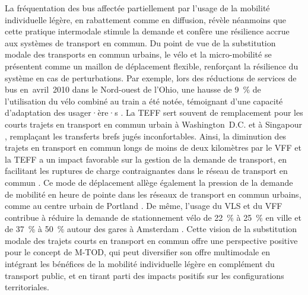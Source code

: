 \begin{refsegment}
La fréquentation des bus affectée partiellement par l'usage de la mobilité individuelle légère, en rabattement comme en diffusion, révèle néanmoins que cette pratique intermodale stimule la demande et confère une résilience accrue aux systèmes de transport en commun. Du point de vue de la substitution modale des transports en commun urbains, le vélo et la micro-mobilité se présentent comme un maillon de déplacement flexible, renforçant la résilience du système en cas de perturbations. Par exemple, lors des réductions de services de bus en~avril~2010 dans le Nord-ouest de l'Ohio, une hausse de 9~\% de l'utilisation du vélo combiné au train a été notée, témoignant d'une capacité d'adaptation des usager·ère·s \textcolor{blue}{\autocite[159]{flamm_changes_2014}}. La \acrshort{TEFF} sert souvent de remplacement pour les courts trajets en transport en commun urbain à Washington~D.C. \textcolor{blue}{\autocite[9]{yan_spatiotemporal_2021}} et à Singapour \textcolor{blue}{\autocite[178]{cao_e-scooter_2021}}, remplaçant les transferts brefs jugés inconfortables. Ainsi, la diminution des trajets en transport en commun longs de moins de deux kilomètres par le \acrshort{VFF} et la \acrshort{TEFF} a un impact favorable sur la gestion de la demande de transport, en facilitant les ruptures de charge contraignantes dans le réseau de transport en commun \textcolor{blue}{\autocite[10]{jin_competition_2019}}. Ce mode de déplacement allège également la pression de la demande de mobilité en heure de pointe dans les réseaux de transport en commun urbains, comme au centre urbain de Portland \textcolor{blue}{\autocite[101]{singleton_exploring_2014}}. De même, l'usage du \acrshort{VLS} et du \acrshort{VFF} contribue à réduire la demande de stationnement vélo de 22~\% à 25~\% en ville et de 37~\% à 50~\% autour des gares à Amsterdam \textcolor{blue}{\autocite[2]{nat_bicycle_2018}}. Cette vision de la substitution modale des trajets courts en transport en commun offre une perspective positive pour le concept de \acrshort{M-TOD}, qui peut diversifier son offre multimodale en intégrant les bénéfices de la mobilité individuelle légère en complément du transport public, et en tirant parti des impacts positifs sur les configurations territoriales.%


\end{refsegment}
